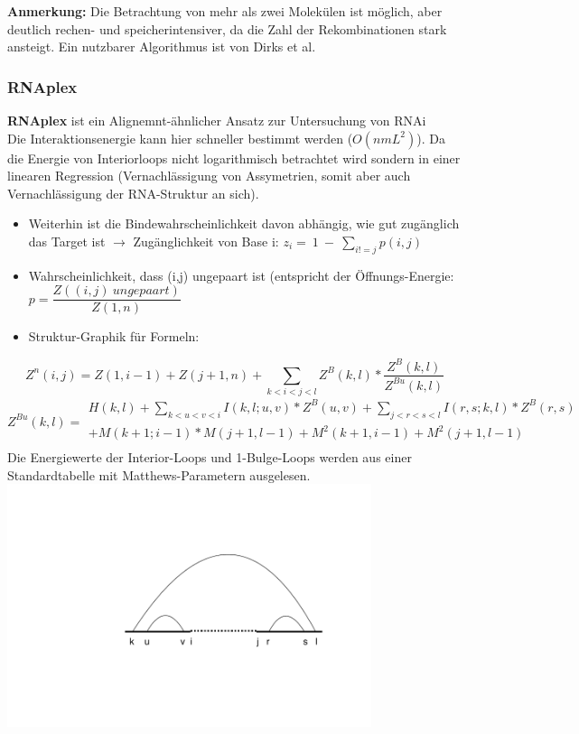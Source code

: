\textbf{Anmerkung:} Die Betrachtung von mehr als zwei Molekülen ist möglich, aber deutlich rechen- und speicherintensiver, da die Zahl der Rekombinationen stark ansteigt. Ein nutzbarer Algorithmus ist von Dirks et al. 

\subsubsection{RNAplex}

\textbf{RNAplex} ist ein Alignemnt-ähnlicher Ansatz zur Untersuchung   von RNAi \\
Die Interaktionsenergie kann hier schneller bestimmt werden ($O(nmL^2)$). Da die Energie von Interiorloops nicht logarithmisch betrachtet wird sondern in einer linearen Regression (Vernachlässigung von Assymetrien, somit aber auch Vernachlässigung der RNA-Struktur an sich).
\begin{itemize}
\item Weiterhin ist die Bindewahrscheinlichkeit davon abhängig, wie gut zugänglich das Target ist $\rightarrow$ Zugänglichkeit von Base i: $ z_i =\ 1\ -\ \displaystyle\sum_{i != j} p(i,j)$
\item Wahrscheinlichkeit, dass (i,j) ungepaart ist (entspricht der Öffnungs-Energie: 
$p = \dfrac{Z((i,j)\ ungepaart)}{Z(1,n)}$ 
\item Struktur-Graphik für Formeln:
\end{itemize}
\begin{equation}
Z^n(i,j) = Z(1,i-1) + Z(j+1,n) + 
\displaystyle\sum_{k<i<j<l} Z^B(k,l) 
* \dfrac{Z^{B}(k,l)}{Z^{Bu}(k,l)}
\end{equation}
\begin{equation}
Z^{Bu}(k,l) =
\begin{split} H(k,l) + \displaystyle\sum_{k<u<v<i} I(k,l;u,v) * Z^B(u,v) +\displaystyle\sum_{j<r<s<l} I(r,s;k,l) * Z^B(r,s) \\
+ M(k+1;i-1)*M(j+1,l-1)+M^2(k+1,i-1)+ M^2(j+1,l-1) \\
\end{split}
\end{equation}
Die Energiewerte der Interior-Loops und 1-Bulge-Loops werden aus einer Standardtabelle mit Matthews-Parametern ausgelesen.\\ \includegraphics[width=0.8\textwidth]{lectures/160509/pix/RNAplex_Abb.pdf}
